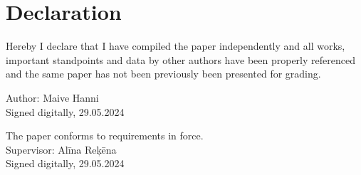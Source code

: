 \chapter*{Declaration}
\thispagestyle{empty}

Hereby I declare that I have compiled the paper independently and all works, important standpoints and data by other authors have been properly referenced and the same paper has not been previously been presented for grading.

Author: Maive Hanni \\
Signed digitally, 29.05.2024 

\vspace{1.5cm}

The paper conforms to requirements in force. \\
Supervisor: Alīna Reķēna \\
Signed digitally, 29.05.2024



